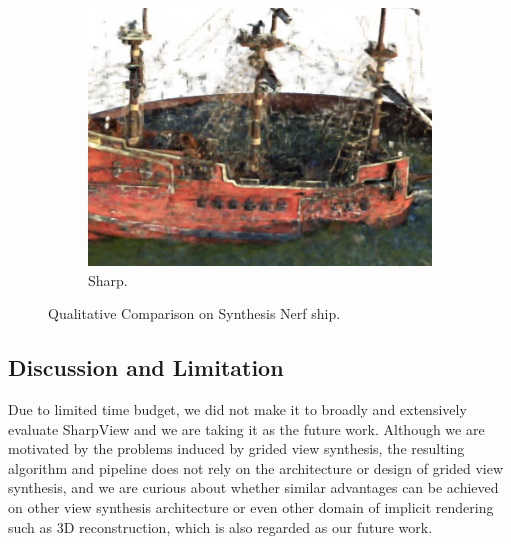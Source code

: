 \begin{figure}[ht!]
\begin{subfigure}{0.19\textwidth}
        \includegraphics[width=\linewidth]{figs/sharpness_ship.jpg}
          \caption{Sharp.}
          \label{fig:sub2}
      \end{subfigure}
  \caption{
  \label{fig:total}
  Qualitative Comparison on Synthesis Nerf ship.
  }
\end{figure}

\subsection{Discussion and Limitation}
Due to limited time budget, we did not make it to broadly and extensively evaluate SharpView and we are taking it as the future work.
Although we are motivated by the problems induced by grided view synthesis, the resulting algorithm and pipeline does not rely on the architecture or design of grided view synthesis, and we are curious about whether similar advantages can be achieved on other view synthesis architecture or even other domain of implicit rendering such as 3D reconstruction, which is also regarded as our future work.